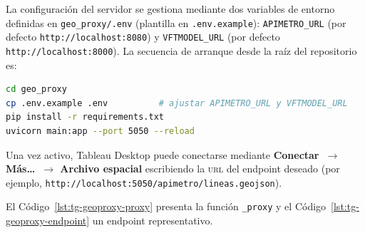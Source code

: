 La configuración del servidor se gestiona mediante dos variables de entorno
definidas en \texttt{geo\_proxy/.env} (plantilla en \texttt{.env.example}):
\texttt{APIMETRO\_URL} (por defecto \texttt{http://localhost:8080}) y
\texttt{VFTMODEL\_URL} (por defecto \texttt{http://localhost:8000}). La
secuencia de arranque desde la raíz del repositorio es:

\begin{lstlisting}[style=estiloBase, language=bash,
  caption={Arranque del servidor \textbf{GeoProxy} en el puerto~5050.},
  label=lst:tg-geoproxy-arranque,
  basicstyle=\small\ttfamily]
cd geo_proxy
cp .env.example .env          # ajustar APIMETRO_URL y VFTMODEL_URL
pip install -r requirements.txt
uvicorn main:app --port 5050 --reload
\end{lstlisting}

Una vez activo, Tableau Desktop puede conectarse mediante
\textbf{Conectar~$\to$ Más\ldots~$\to$ Archivo espacial} escribiendo la
\textsc{url} del endpoint deseado (por ejemplo,
\nolinkurl{http://localhost:5050/apimetro/lineas.geojson}).

El Código~\ref{lst:tg-geoproxy-proxy} presenta la función \texttt{\_proxy} y el
Código~\ref{lst:tg-geoproxy-endpoint} un endpoint representativo.




